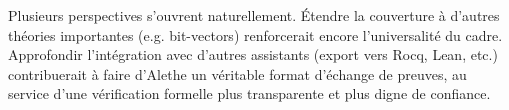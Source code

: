Plusieurs perspectives s'ouvrent naturellement. Étendre la couverture à d'autres théories importantes (e.g. bit-vectors) renforcerait encore l'universalité du cadre.
Approfondir l'intégration avec d'autres assistants (export vers Rocq, Lean, etc.) contribuerait à faire d'Alethe un véritable format d'échange de preuves, au service d'une vérification formelle plus transparente et plus digne de confiance.

\captionsetup[figure]{list=yes}
\captionsetup[table]{list=yes}
\captionsetup[lstlisting]{list=yes}

\renewcommand{\tablename}{Table}
\renewcommand{\figurename}{Figure}
\renewcommand{\lstlistingname}{Listing}

\setcounter{figure}{0}
\setcounter{equation}{0}
\setcounter{table}{0}
\setcounter{lstlisting}{0}
